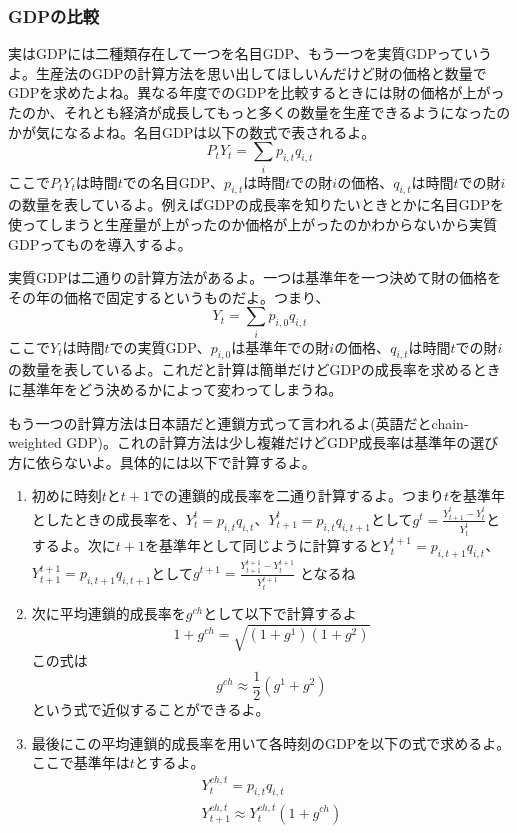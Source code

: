 \documentclass[a4paper, 12pt]{article}
\begin{document}
\subsubsection{GDPの比較}
実はGDPには二種類存在して一つを名目GDP、もう一つを実質GDPっていうよ。生産法のGDPの計算方法を思い出してほしいんだけど財の価格と数量でGDPを求めたよね。異なる年度でのGDPを比較するときには財の価格が上がったのか、それとも経済が成長してもっと多くの数量を生産できるようになったのかが気になるよね。名目GDPは以下の数式で表されるよ。
\begin{equation*}
  P_tY_t=\sum_i p_{i,t}q_{i,t}
\end{equation*}
ここで$P_tY_t$は時間$t$での名目GDP、$p_{i,t}$は時間$t$での財$i$の価格、$q_{i,t}$は時間$t$での財$i$の数量を表しているよ。例えばGDPの成長率を知りたいときとかに名目GDPを使ってしまうと生産量が上がったのか価格が上がったのかわからないから実質GDPってものを導入するよ。

実質GDPは二通りの計算方法があるよ。一つは基準年を一つ決めて財の価格をその年の価格で固定するというものだよ。つまり、
\begin{equation*}
  Y_t=\sum_i p_{i,0}q_{i,t}
\end{equation*}
ここで$Y_t$は時間$t$での実質GDP、$p_{i,0}$は基準年での財$i$の価格、$q_{i,t}$は時間$t$での財$i$の数量を表しているよ。これだと計算は簡単だけどGDPの成長率を求めるときに基準年をどう決めるかによって変わってしまうね。

もう一つの計算方法は日本語だと連鎖方式って言われるよ(英語だとchain-weighted GDP)。これの計算方法は少し複雑だけどGDP成長率は基準年の選び方に依らないよ。具体的には以下で計算するよ。
\begin{enumerate}
  \item 初めに時刻$t$と$t+1$での連鎖的成長率を二通り計算するよ。つまり$t$を基準年としたときの成長率を、$Y_t^t=p_{i,t}q_{i,t}$、$Y_{t+1}^t=p_{i,t}q_{i,t+1}$として$\displaystyle g^t=\frac{Y_{t+1}^t-Y_t^t}{Y_t^t}$とするよ。次に$t+1$を基準年として同じように計算すると$Y_t^{t+1}=p_{i,t+1}q_{i,t}$、$Y_{t+1}^{t+1}=p_{i,t+1}q_{i,t+1}$として$\displaystyle g^{t+1}=\frac{Y_{t+1}^{t+1}-Y_t^{t+1}}{Y_t^{t+1}}$
  となるね
  \item 次に平均連鎖的成長率を$g^{ch}$として以下で計算するよ
  \begin{equation*}
    1+g^{ch}=\sqrt{\left(1+g^1\right)\left(1+g^2\right)}
  \end{equation*}
  この式は
  \begin{equation*}
    g^{ch}\approx \frac{1}{2}\left(g^1+g^2\right)
  \end{equation*}
  という式で近似することができるよ。
  \item 最後にこの平均連鎖的成長率を用いて各時刻のGDPを以下の式で求めるよ。ここで基準年は$t$とするよ。
  \begin{displaymath}
    \begin{array}{l}
      Y_t^{ch,t}=p_{i,t}q_{i,t}\\
      Y_{t+1}^{ch,t} \approx Y_t^{ch,t}(1+g^{ch})
    \end{array}
  \end{displaymath}
\end{enumerate}
\end{document}
